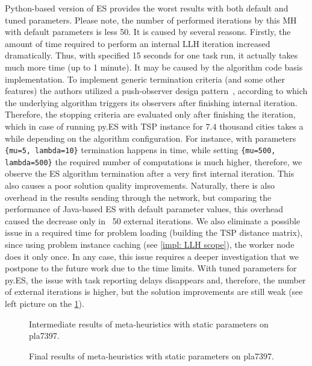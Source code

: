 Python-based version of ES provides the worst results with both default and tuned parameters. Please note, the number of performed iterations by this MH with default parameters is less 50. It is caused by several reasons. Firstly, the amount of time required to perform an internal LLH iteration increased dramatically. Thus, with specified 15 seconds for one task run, it actually takes much more time (up to 1 minute). It may be caused by the algorithm code basis implementation. To implement generic termination criteria (and some other features) the authors utilized a push-observer design pattern~\cite{benitez2019jmetalpy}, according to which the underlying algorithm triggers its observers after finishing internal iteration. Therefore, the stopping criteria are evaluated only after finishing the iteration, which in case of running py.ES with TSP instance for $7.4$ thousand cities takes a while depending on the algorithm configuration. For instance, with parameters \texttt{\{mu=5, lambda=10\}} termination happens in time, while setting \texttt{\{mu=500, lambda=500\}} the required number of computations is much higher, therefore, we observe the ES algorithm termination after a very first internal iteration. This also causes a poor solution quality improvements. Naturally, there is also overhead in the results sending through the network, but comparing the performance of Java-based ES with default parameter values, this overhead caused the decrease only in ~50 external iterations. We also eliminate a possible issue in a required time for problem loading (building the TSP distance matrix), since using problem instance caching (see \cref{impl: LLH scope}), the worker node does it only once. In any case, this issue requires a deeper investigation that we postpone to the future work due to the time limits. With tuned parameters for py.ES, the issue with task reporting delays disappears and, therefore, the number of external iterations is higher, but the solution improvements are still weak (see left picture on the \cref{eval:pict:bl:pla7397 intermediate}).

\begin{figure}[b]
	\centering
	\vspace{-20pt}
	
	\caption{Intermediate results of meta-heuristics with static parameters on pla7397.}
	\vspace{-5pt}
	\label{eval:pict:bl:pla7397 intermediate}
\end{figure}

\begin{wrapfigure}{R}{0.5\textwidth}%
	\centering
	
	\label{eval:pict:bl:pla7397 final}
	\caption{Final results of meta-heuristics with static parameters on pla7397.}
	\vspace{-10pt}
\end{wrapfigure}

